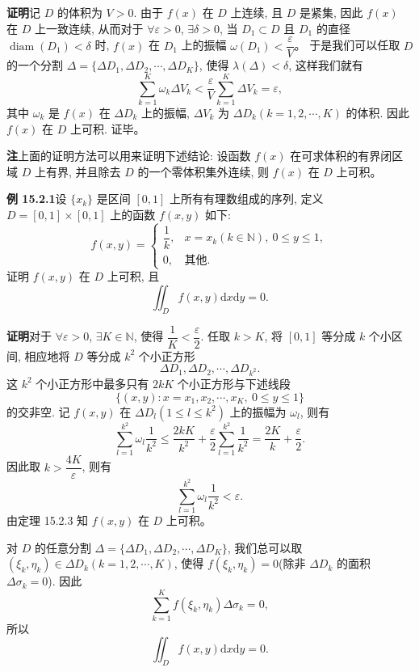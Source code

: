 \documentclass[UTF8,12pt,a4paper,fontset=fandol]{ctexart}
\begin{document}
\noindent\textbf{证明}\quad 记 $D$ 的体积为 $V>0$. 由于 $f(x)$ 在 $D$ 上连续, 且 $D$ 是紧集, 因此 $f(x)$ 在 $D$ 上一致连续, 从而对于 $\forall\varepsilon>0$, $\exists\delta>0$, 当 $D_1\subset D$ 且 $D_1$ 的直径 $\operatorname{diam}(D_1)<\delta$ 时, $f(x)$ 在 $D_1$ 上的振幅 $\omega(D_1)<\dfrac{\varepsilon}{V}$。
于是我们可以任取 $D$ 的一个分割 $\Delta=\{\Delta D_1,\Delta D_2,\cdots,\Delta D_K\}$, 使得 $\lambda(\Delta)<\delta$, 这样我们就有
\[
  \sum_{k=1}^K\omega_k\Delta V_k<\frac{\varepsilon}{V}\sum_{k=1}^K\Delta V_k=\varepsilon,
\]
其中 $\omega_k$ 是 $f(x)$ 在 $\Delta D_k$ 上的振幅, $\Delta V_k$ 为 $\Delta D_k(k=1,2,\cdots,K)$ 的体积. 因此 $f(x)$ 在 $D$ 上可积. 证毕。

\noindent\textbf{注}\quad 上面的证明方法可以用来证明下述结论: 设函数 $f(x)$ 在可求体积的有界闭区域 $D$ 上有界, 并且除去 $D$ 的一个零体积集外连续, 则 $f(x)$ 在 $D$ 上可积。

\noindent\textbf{例 15.2.1}\quad 设 $\{x_k\}$ 是区间 $[0,1]$ 上所有有理数组成的序列, 定义 $D=[0,1]\times[0,1]$ 上的函数 $f(x,y)$ 如下:
\[
  f(x,y)=
  \begin{cases}
    \dfrac1k, & x=x_k(k\in\mathbb N),\ 0\leqslant y\leqslant1,\\
    0, & \text{其他}.
  \end{cases}
\]
证明 $f(x,y)$ 在 $D$ 上可积, 且
\[
  \iint_D f(x,y)\mathrm dx\mathrm dy=0.
\]

\noindent\textbf{证明}\quad 对于 $\forall\varepsilon>0$, $\exists K\in\mathbb N$, 使得 $\dfrac1K<\dfrac{\varepsilon}{2}$. 任取 $k>K$, 将 $[0,1]$ 等分成 $k$ 个小区间, 相应地将 $D$ 等分成 $k^2$ 个小正方形
\[
  \Delta D_1,\Delta D_2,\cdots,\Delta D_{k^2}.
\]
这 $k^2$ 个小正方形中最多只有 $2kK$ 个小正方形与下述线段
\[
  \{(x,y):x=x_1,x_2,\cdots,x_K,\ 0\leqslant y\leqslant1\}
\]
的交非空. 记 $f(x,y)$ 在 $\Delta D_l(1\leqslant l\leqslant k^2)$ 上的振幅为 $\omega_l$, 则有
\[
  \sum_{l=1}^{k^2}\omega_l\frac1{k^2}
  \leqslant \frac{2kK}{k^2}+\frac{\varepsilon}{2}\sum_{l=1}^{k^2}\frac1{k^2}
  =\frac{2K}{k}+\frac{\varepsilon}{2}.
\]
因此取 $k>\dfrac{4K}{\varepsilon}$, 则有
\[
  \sum_{l=1}^{k^2}\omega_l\frac1{k^2}<\varepsilon.
\]
由定理 15.2.3 知 $f(x,y)$ 在 $D$ 上可积。

对 $D$ 的任意分割 $\Delta=\{\Delta D_1,\Delta D_2,\cdots,\Delta D_K\}$, 我们总可以取 $(\xi_k,\eta_k)\in\Delta D_k(k=1,2,\cdots,K)$, 使得 $f(\xi_k,\eta_k)=0$(除非 $\Delta D_k$ 的面积 $\Delta\sigma_k=0$). 因此
\[
  \sum_{k=1}^K f(\xi_k,\eta_k)\Delta\sigma_k=0,
\]
所以
\[
  \iint_D f(x,y)\mathrm dx\mathrm dy=0.
\]
\end{document}
